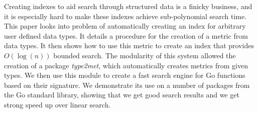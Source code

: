 Creating indexes to aid search through structured data is a finicky business,
and it is especially hard to make these indexes achieve sub-polynomial search time.
This paper looks into problem of automatically creating an index for arbitrary user defined data types.
It details a procedure for the creation of a metric from data types.
It then shows how to use this metric to create an index that provides $O(\log(n))$ bounded search.
The modularity of this system allowed the creation of a package \textit{type2met},
which automatically creates metrics from given types.
We then use this module to create a fast search engine for Go functions based on their signature.
We demonstrate its use on a number of packages from the Go standard library,
showing that we get good search results and we get strong speed up over linear search.